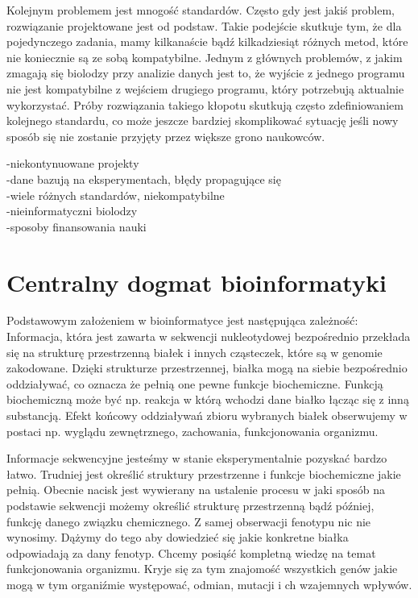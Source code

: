 Kolejnym problemem jest mnogość standardów. Często gdy jest jakiś problem, rozwiązanie projektowane jest od podstaw. Takie podejście skutkuje tym, że dla pojedynczego zadania, mamy kilkanaście bądź kilkadziesiąt różnych metod, które nie koniecznie są ze sobą kompatybilne. Jednym z głównych problemów, z jakim zmagają się biolodzy przy analizie danych jest to, że wyjście z jednego programu nie jest kompatybilne z wejściem drugiego programu, który potrzebują aktualnie wykorzystać. Próby rozwiązania takiego kłopotu skutkują często zdefiniowaniem kolejnego standardu, co może jeszcze bardziej skomplikować sytuację jeśli nowy sposób się nie zostanie przyjęty przez większe grono naukowców.


-niekontynuowane projekty \\
-dane bazują na eksperymentach, błędy propagujące się \\
-wiele różnych standardów, niekompatybilne \\
-nieinformatyczni biolodzy \\
-sposoby finansowania nauki \\

\section{Centralny dogmat bioinformatyki}
Podstawowym założeniem w bioinformatyce jest następująca zależność:
Informacja, która jest zawarta w sekwencji nukleotydowej bezpośrednio przekłada się na strukturę przestrzenną białek i innych cząsteczek, które są w genomie zakodowane. Dzięki strukturze przestrzennej, białka mogą na siebie bezpośrednio oddziaływać, co oznacza że pełnią one pewne funkcje biochemiczne. Funkcją biochemiczną może być np. reakcja w którą wchodzi dane białko łącząc się z inną substancją. Efekt końcowy oddziaływań zbioru wybranych białek obserwujemy w postaci np. wyglądu zewnętrznego, zachowania, funkcjonowania organizmu.

Informacje sekwencyjne jesteśmy w stanie eksperymentalnie pozyskać bardzo łatwo. Trudniej jest określić struktury przestrzenne i funkcje biochemiczne jakie pełnią.
Obecnie nacisk jest wywierany na ustalenie procesu w jaki sposób na podstawie sekwencji możemy określić strukturę przestrzenną bądź później, funkcję danego związku chemicznego.
Z samej obserwacji fenotypu nic nie wynosimy. Dążymy do tego aby dowiedzieć się jakie konkretne białka odpowiadają za dany fenotyp. Chcemy posiąść kompletną wiedzę na temat funkcjonowania organizmu. Kryje się za tym znajomość wszystkich genów jakie mogą w tym organiźmie występować, odmian, mutacji i ch wzajemnych wpływów.

